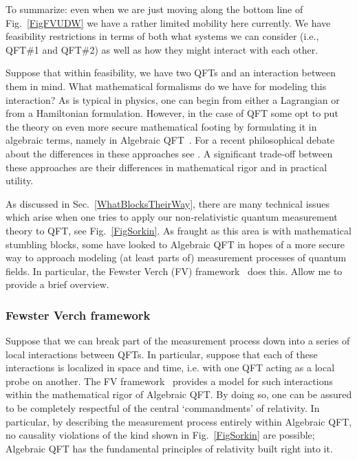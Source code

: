 \documentclass[prd,twocolumn,superscriptaddress,floatfix,amsmath,amssymb,amsfonts,nofootinbib]{revtex4-2}
\begin{document}

To summarize: even when we are just moving along the bottom line of Fig.~\ref{FigFVUDW} we have a rather limited mobility here currently. We have feasibility restrictions in terms of both what systems we can consider (i.e., QFT\#1 and QFT\#2) as well as how they might interact with each other.

Suppose that within feasibility, we have two QFTs and an interaction between them in mind. What mathematical formalisms do we have for modeling this interaction? As is typical in physics, one can begin from either a Lagrangian or from a Hamiltonian formulation. However, in the case of QFT some opt to put the theory on even more secure mathematical footing by formulating it in algebraic terms, namely in Algebraic QFT~\cite{sep-qt-nvd}. For a recent philosophical debate about the differences in these approaches see \cite{WallaceNaive,Wallace2011,Fraser2009,Fraser2011}. A significant trade-off between these approaches are their differences in mathematical rigor and in practical utility.

As discussed in Sec.~\ref{WhatBlocksTheirWay}, there are many technical issues which arise when one tries to apply our non-relativistic quantum measurement theory to QFT, see Fig.~\ref{FigSorkin}. As fraught as this area is with mathematical stumbling blocks, some have looked to Algebraic QFT in hopes of a more secure way to approach modeling (at least parts of) measurement processes of quantum fields. In particular, the Fewster Verch (FV) framework~\cite{fewster1,fewster2,fewster3} does this. Allow me to provide a brief overview.

\subsubsection*{Fewster Verch framework}
Suppose that we can break part of the measurement process down into a series of local interactions between QFTs. In particular, suppose that each of these interactions is localized in space and time, i.e. with one QFT acting as a local probe on another. The FV framework~\cite{fewster1,fewster2,fewster3} provides a model for such interactions within the mathematical rigor of Algebraic QFT. By doing so, one can be assured to be completely respectful of the central `commandments' of relativity. In particular, by describing the measurement process entirely within Algebraic QFT, no causality violations of the kind shown in Fig.~\ref{FigSorkin} are possible; Algebraic QFT has the fundamental principles of relativity built right into it.
\end{document}

